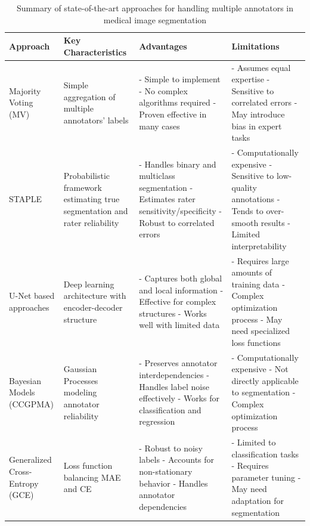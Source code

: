 \begin{table}[htbp]
  \centering
  \caption{Summary of state-of-the-art approaches for handling
  multiple annotators in medical image segmentation}
  \label{tab:state_of_art_summary}
  \begin{tabular}{p{}p{}p{}p{}}
    \toprule
    \textbf{Approach} & \textbf{Key Characteristics} &
    \textbf{Advantages} & \textbf{Limitations} \\
    \midrule
    Majority Voting (MV) & Simple aggregation of multiple annotators' labels &
    - Simple to implement
    - No complex algorithms required
    - Proven effective in many cases &
    - Assumes equal expertise
    - Sensitive to correlated errors
    - May introduce bias in expert tasks \\
    \midrule
    STAPLE & Probabilistic framework estimating true segmentation and
    rater reliability &
    - Handles binary and multiclass segmentation
    - Estimates rater sensitivity/specificity
    - Robust to correlated errors &
    - Computationally expensive
    - Sensitive to low-quality annotations
    - Tends to over-smooth results
    - Limited interpretability \\
    \midrule
    U-Net based approaches & Deep learning architecture with
    encoder-decoder structure &
    - Captures both global and local information
    - Effective for complex structures
    - Works well with limited data &
    - Requires large amounts of training data
    - Complex optimization process
    - May need specialized loss functions \\
    \midrule
    Bayesian Models (CCGPMA) & Gaussian Processes modeling annotator
    reliability &
    - Preserves annotator interdependencies
    - Handles label noise effectively
    - Works for classification and regression &
    - Computationally expensive
    - Not directly applicable to segmentation
    - Complex optimization process \\
    \midrule
    Generalized Cross-Entropy (GCE) & Loss function balancing MAE and CE &
    - Robust to noisy labels
    - Accounts for non-stationary behavior
    - Handles annotator dependencies &
    - Limited to classification tasks
    - Requires parameter tuning
    - May need adaptation for segmentation \\
    \bottomrule
  \end{tabular}
\end{table}
